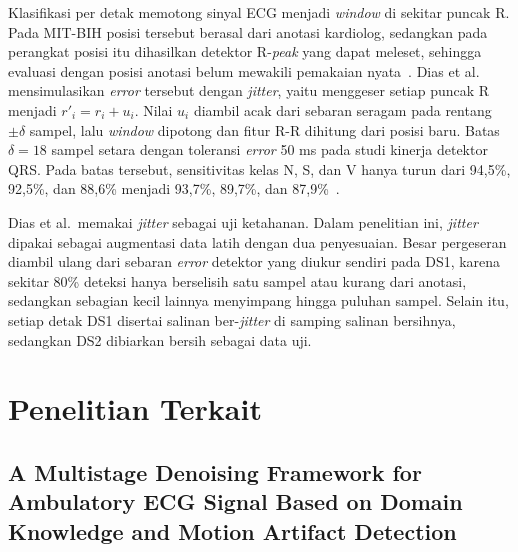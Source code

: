 Klasifikasi per detak memotong sinyal ECG menjadi \textit{window} di sekitar puncak R. Pada MIT-BIH posisi tersebut berasal dari anotasi kardiolog, sedangkan pada perangkat posisi itu dihasilkan detektor R-\textit{peak} yang dapat meleset, sehingga evaluasi dengan posisi anotasi belum mewakili pemakaian nyata~\cite{dias_2021}. Dias et al.~\cite{dias_2021} mensimulasikan \textit{error} tersebut dengan \textit{jitter}, yaitu menggeser setiap puncak R menjadi $r'_i = r_i + u_i$. Nilai $u_i$ diambil acak dari sebaran seragam pada rentang $\pm\delta$ sampel, lalu \textit{window} dipotong dan fitur R-R dihitung dari posisi baru. Batas $\delta = 18$ sampel setara dengan toleransi \textit{error} 50 ms pada studi kinerja detektor QRS. Pada batas tersebut, sensitivitas kelas N, S, dan V hanya turun dari 94,5\%, 92,5\%, dan 88,6\% menjadi 93,7\%, 89,7\%, dan 87,9\%~\cite{dias_2021}.

Dias et al.\ memakai \textit{jitter} sebagai uji ketahanan. Dalam penelitian ini, \textit{jitter} dipakai sebagai augmentasi data latih dengan dua penyesuaian. Besar pergeseran diambil ulang dari sebaran \textit{error} detektor yang diukur sendiri pada DS1, karena sekitar 80\% deteksi hanya berselisih satu sampel atau kurang dari anotasi, sedangkan sebagian kecil lainnya menyimpang hingga puluhan sampel. Selain itu, setiap detak DS1 disertai salinan ber-\textit{jitter} di samping salinan bersihnya, sedangkan DS2 dibiarkan bersih sebagai data uji.

\section{Penelitian Terkait}

\subsection{A Multistage Denoising Framework for Ambulatory ECG Signal Based on Domain Knowledge and Motion Artifact Detection}

